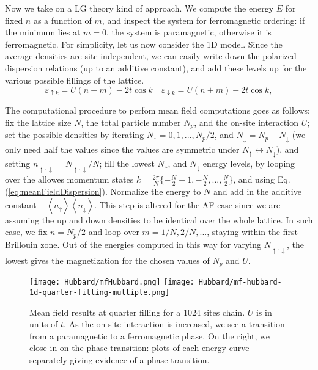 Now we take on a \acl{LG} theory kind of approach.
We compute the energy $E$ for fixed $n$ as a function of $m$, and inspect the system for ferromagnetic ordering: if the minimum lies at $m = 0$, the system is paramagnetic, otherwise it is ferromagnetic.
For simplicity, let us now consider the \acs{1D} model.
Since the average densities are site-independent, we can easily write down the polarized dispersion relations (up to an additive constant), and add these levels up for the various possible fillings of the lattice.
\begin{equation}\label{eq:meanFieldDispersion}
\varepsilon_{\uparrow k} = U ( n - m ) - 2 t \cos k \quad \varepsilon_{\downarrow k} = U ( n + m ) - 2 t \cos k ,
\end{equation}

The computational procedure to perfom mean field computations goes as follows: fix the lattice size $N$, the total particle number $N_p$, and the on-site interaction $U$; set the possible densities by iterating $N_\uparrow = 0, 1, ..., N_p / 2$, and $N_\downarrow = N_p - N_\downarrow$ (we only need half the values since the values are symmetric under $ N_\uparrow \leftrightarrow N_\downarrow$), and setting $n_{\uparrow, \downarrow} = N_{\uparrow, \downarrow} / N$; fill the lowest $N_\uparrow$, and $N_\downarrow$ energy levels, by looping over the allowes momentum states $k = \frac{2\pi}{N} \{ -\frac{N}{2} + 1, -\frac{N}{2}, ..., \frac{N}{2} \}$, and using Eq.(\ref{eq:meanFieldDispersion}).
Normalize the energy to $N$ and add in the additive constant $- \left\langle n_\uparrow \right\rangle \left\langle n_\downarrow \right\rangle$.
This step is altered for the \acs{AF} case since we are assuming the up and down densities to be identical over the whole lattice.
In such case, we fix $n = N_p / 2$ and loop over $m = 1/ N, 2 / N,...$, staying within the first Brillouin zone.
Out of the energies computed in this way for varying $N_{\uparrow, \downarrow}$, the lowest gives the magnetization for the chosen values of $N_p$ and $U$.
\begin{figure}
\hspace{-3mm}
\texttt{[image: Hubbard/mfHubbard.png]}
\hspace{-2.5mm}
\texttt{[image: Hubbard/mf-hubbard-1d-quarter-filling-multiple.png]}
	\caption[Mean field results for the \acs{1D} Hubbard model.]{Mean field results at quarter filling for a $ 1024$ sites chain.
	$U$ is in units of $t$.
	As the on-site interaction is increased, we see a transition from a paramagnetic to a ferromagnetic phase. On the right, we close in on the phase transition: plots of each energy curve separately giving evidence of a phase transition.}
	\label{fig:mft}
\end{figure}

